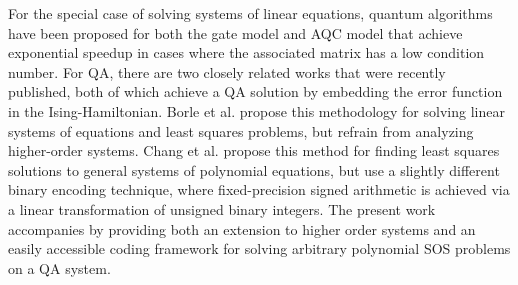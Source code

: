 For the special case of solving systems of linear equations, quantum algorithms have been proposed for both the gate model \cite{PhysRevLett.103.150502} and AQC model \cite{PhysRevLett.122.060504,PhysRevA.99.012320} that achieve exponential speedup in cases where the associated matrix has a low condition number.
For QA, there are two closely related works that were recently published, both of which achieve a QA solution by embedding the error function in the Ising-Hamiltonian.
Borle et al. \cite{borle2019analyzing} propose this methodology for solving linear systems of equations and least squares problems, but refrain from analyzing higher-order systems.
Chang et al. \cite{chang2019quantum} propose this method for finding least squares solutions to general systems of polynomial equations, but use a slightly different binary encoding technique, where fixed-precision signed arithmetic is achieved via a linear transformation of unsigned binary integers. The present work accompanies \cite{borle2019analyzing,chang2019quantum} by providing both an extension to higher order systems and an easily accessible coding framework for solving arbitrary polynomial SOS problems on a QA system.
